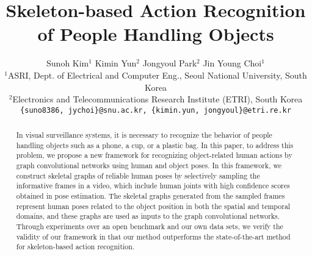\documentclass[10pt,twocolumn,letterpaper]{article}
\begin{document}
\title{Skeleton-based Action Recognition of People Handling Objects
}
\author{Sunoh Kim$^1$ \hspace{1.5cm} Kimin Yun$^2$ \hspace{1.5cm} Jongyoul Park$^2$ \hspace{1.5cm} Jin Young Choi$^1$ \\
$^1$ASRI, Dept. of Electrical and Computer Eng., Seoul National University, South Korea\\
$^2$Electronics and Telecommunications Research Institute (ETRI), South Korea\\
{\tt\small \{suno8386, jychoi\}@snu.ac.kr, \{kimin.yun, jongyoul\}@etri.re.kr}
}


\maketitle
\ifwacvfinal\thispagestyle{empty}\fi

\begin{abstract}
In visual surveillance systems, it is necessary to recognize the behavior of people handling objects such as a phone, a cup, or a plastic bag.
In this paper, to address this problem, we propose a new framework for recognizing object-related human actions by graph convolutional networks using human and object poses. 
In this framework, we construct skeletal graphs of reliable human poses by selectively sampling the informative frames in a video, which include human joints with high confidence scores obtained in pose estimation.
The skeletal graphs generated from the sampled frames represent human poses related to the object position in both the spatial and temporal domains, and these graphs are used as inputs to the graph convolutional networks.
Through experiments over an open benchmark and our own data sets, we verify the validity of our framework in that our method outperforms the state-of-the-art method for skeleton-based action recognition. 
\end{abstract}
\end{document}
